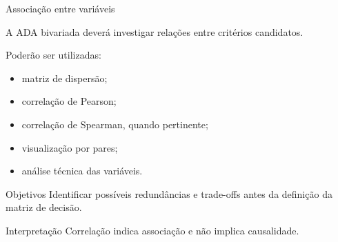 
\begin{frame}{Associação entre variáveis}

    A ADA bivariada deverá investigar relações entre critérios
    candidatos.

    \vspace{0.3cm}

    Poderão ser utilizadas:

    \begin{itemize}
        \item matriz de dispersão;
        \item correlação de Pearson;
        \item correlação de Spearman, quando pertinente;
        \item visualização por pares;
        \item análise técnica das variáveis.
    \end{itemize}

    \vspace{0.3cm}

    \begin{block}{Objetivos}
        Identificar possíveis redundâncias e trade-offs antes da
        definição da matriz de decisão.
    \end{block}

    \vspace{0.2cm}

    \begin{alertblock}{Interpretação}
        Correlação indica associação e não implica causalidade.
    \end{alertblock}

\end{frame}



